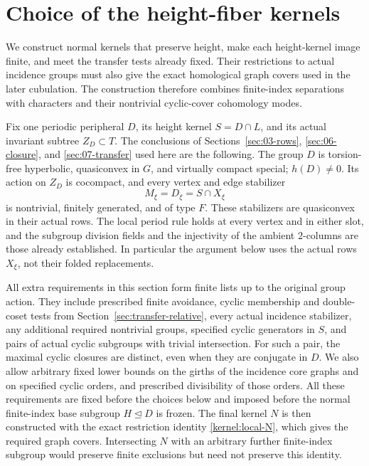 \section{Choice of the height-fiber kernels}\label{sec:08-kernels}

We construct normal kernels that preserve height, make each
height-kernel image finite, and meet the transfer tests already fixed.
Their restrictions to actual incidence groups must also give the exact
homological graph covers used in the later cubulation. The construction
therefore combines finite-index separations with characters and their
nontrivial cyclic-cover cohomology modes.

Fix one periodic peripheral \(D\), its height kernel \(S=D\cap L\),
and its actual invariant subtree \(Z_D\subset T\).  The conclusions of
Sections~\ref{sec:03-rows}, \ref{sec:06-closure}, and
\ref{sec:07-transfer} used here are the following.  The group \(D\) is
torsion-free hyperbolic, quasiconvex in \(G\), and virtually compact
special; \(h(D)\ne0\).  Its action on \(Z_D\) is cocompact, and every
vertex and edge stabilizer
\[
                         M_\xi=D_\xi=S\cap X_\xi
\]
is nontrivial, finitely generated, and of type \(F\).  These stabilizers
are quasiconvex in their actual rows.  The local period rule holds at
every vertex and in either slot, and the subgroup division fields and
the injectivity of the ambient \(2\)-columns are those already
established.  In particular the argument below uses the actual rows
\(X_\xi\), not their folded replacements.

All extra requirements in this section form finite lists up to the
original group action.  They include prescribed finite avoidance,
cyclic membership and double-coset tests from
Section~\ref{sec:transfer-relative}, every actual incidence stabilizer,
any additional required nontrivial groups,
specified cyclic generators in \(S\), and pairs of actual cyclic
subgroups with trivial intersection.  For such a pair, the maximal
cyclic closures are distinct, even when they are conjugate in \(D\).
We also allow arbitrary fixed lower bounds on the girths of the
incidence core graphs and on specified cyclic orders, and prescribed
divisibility of those orders.  All these requirements are fixed before
the choices below and imposed before the normal finite-index base
subgroup \(H\unlhd D\) is frozen.  The final kernel \(N\) is then
constructed with the exact restriction identity
\eqref{kernel:local-N}, which gives the required graph covers.
Intersecting \(N\) with an arbitrary further finite-index subgroup
would preserve finite exclusions but need not preserve this identity.

